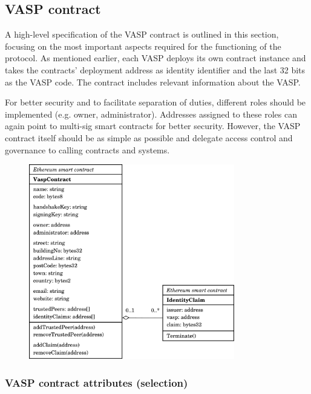\documentclass{article}
\begin{document}
\subsection{VASP contract}

A high-level specification of the VASP contract is outlined in this section, focusing on the most important aspects required for the functioning of the protocol.
As mentioned earlier, each VASP deploys its own contract instance and takes the contracts’ deployment address as identity identifier and the last 32 bits as the VASP code. The contract includes relevant information about the VASP.

For better security and to facilitate separation of duties, different roles should be implemented (e.g. owner, administrator). Addresses assigned to these roles can again point to multi-sig smart contracts for better security. However, the VASP contract itself should be as simple as possible and delegate access control and governance to calling contracts and systems.
\vspace{2em}
\begin{figure}[h]
    \centering
    \includegraphics[width=0.8\textwidth]{g6.pdf}
\end{figure}

\subsubsection{VASP contract attributes (selection)}
\end{document}
